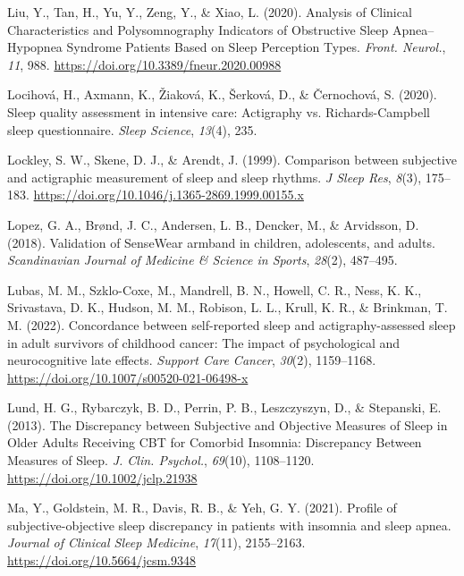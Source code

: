 \documentclass[
]{article}
\newlength{\cslhangindent}
\newenvironment{CSLReferences}[2] %
 {\begin{list}{}{%
  \setlength{\itemindent}{0pt}
  \setlength{\leftmargin}{0pt}
  \setlength{\parsep}{0pt}
  \ifodd #1
   \setlength{\leftmargin}{\cslhangindent}
   \setlength{\itemindent}{-1\cslhangindent}
  \fi
  \setlength{\itemsep}{#2\baselineskip}}}
 {\end{list}}
\begin{document}
\begin{CSLReferences}{1}{0}
Liu, Y., Tan, H., Yu, Y., Zeng, Y., \& Xiao, L. (2020). Analysis of {Clinical} {Characteristics} and {Polysomnography} {Indicators} of {Obstructive} {Sleep} {Apnea}--{Hypopnea} {Syndrome} {Patients} {Based} on {Sleep} {Perception} {Types}. \emph{Front. Neurol.}, \emph{11}, 988. \url{https://doi.org/10.3389/fneur.2020.00988}

Locihová, H., Axmann, K., Žiaková, K., Šerková, D., \& Černochová, S. (2020). Sleep quality assessment in intensive care: Actigraphy vs. {Richards}-{Campbell} sleep questionnaire. \emph{Sleep Science}, \emph{13}(4), 235.

Lockley, S. W., Skene, D. J., \& Arendt, J. (1999). Comparison between subjective and actigraphic measurement of sleep and sleep rhythms. \emph{J Sleep Res}, \emph{8}(3), 175--183. \url{https://doi.org/10.1046/j.1365-2869.1999.00155.x}

Lopez, G. A., Brønd, J. C., Andersen, L. B., Dencker, M., \& Arvidsson, D. (2018). Validation of SenseWear armband in children, adolescents, and adults. \emph{Scandinavian Journal of Medicine \& Science in Sports}, \emph{28}(2), 487--495.

Lubas, M. M., Szklo-Coxe, M., Mandrell, B. N., Howell, C. R., Ness, K. K., Srivastava, D. K., Hudson, M. M., Robison, L. L., Krull, K. R., \& Brinkman, T. M. (2022). Concordance between self-reported sleep and actigraphy-assessed sleep in adult survivors of childhood cancer: The impact of psychological and neurocognitive late effects. \emph{Support Care Cancer}, \emph{30}(2), 1159--1168. \url{https://doi.org/10.1007/s00520-021-06498-x}

Lund, H. G., Rybarczyk, B. D., Perrin, P. B., Leszczyszyn, D., \& Stepanski, E. (2013). The {Discrepancy} between {Subjective} and {Objective} {Measures} of {Sleep} in {Older} {Adults} {Receiving} {CBT} for {Comorbid} {Insomnia}: {Discrepancy} {Between} {Measures} of {Sleep}. \emph{J. Clin. Psychol.}, \emph{69}(10), 1108--1120. \url{https://doi.org/10.1002/jclp.21938}

Ma, Y., Goldstein, M. R., Davis, R. B., \& Yeh, G. Y. (2021). Profile of subjective-objective sleep discrepancy in patients with insomnia and sleep apnea. \emph{Journal of Clinical Sleep Medicine}, \emph{17}(11), 2155--2163. \url{https://doi.org/10.5664/jcsm.9348}


\end{CSLReferences}
\end{document}
